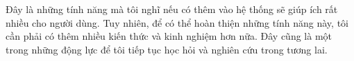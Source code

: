 \documentclass[../DoAn.tex]{subfiles}
\begin{document}
Đây là những tính năng mà tôi nghĩ nếu có thêm vào hệ thống sẽ giúp ích rất nhiều cho người dùng. Tuy nhiên, để có thể hoàn thiện những tính năng này, tôi cần phải có thêm nhiều kiến thức và kinh nghiệm hơn nữa. Đây cũng là một trong những động lực để tôi tiếp tục học hỏi và nghiên cứu trong tương lai.
\end{document}
